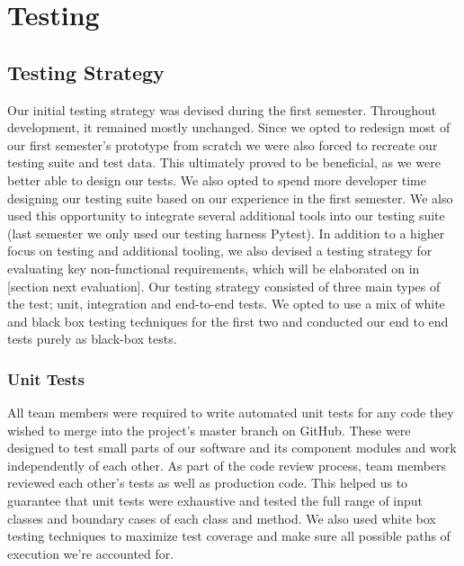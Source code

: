 \documentclass[main.tex]{subfiles}
\begin{document}
\section{Testing}
\label{Testing}

\subsection{Testing Strategy}

Our initial testing strategy was devised during the first semester. Throughout development, it remained mostly unchanged. Since we opted to redesign most of our first semester’s prototype from scratch we were also forced to recreate our testing suite and test data. This ultimately proved to be beneficial, as we were better able to design our tests. We also opted to spend more developer time designing our testing suite based on our experience in the first semester. We also used this opportunity to integrate several additional tools into our testing suite (last semester we only used our testing harness Pytest). In addition to a higher focus on testing and additional tooling, we also devised a testing strategy for evaluating key non-functional requirements, which will be elaborated on in [section next evaluation]. Our testing strategy consisted of three main types of the test; unit, integration and end-to-end tests. We opted to use a mix of white and black box testing techniques for the first two and conducted our end to end tests purely as black-box tests.

\subsubsection{Unit Tests}
All team members were required to write automated unit tests for any code they wished to merge into the project’s master branch on GitHub. These were designed to test small parts of our software and its component modules and work independently of each other. As part of the code review process, team members reviewed each other's tests as well as production code. This helped us to guarantee that unit tests were exhaustive and tested the full range of input classes and boundary cases of each class and method. We also used white box testing techniques to maximize test coverage and make sure all possible paths of execution we’re accounted for.
\end{document}
